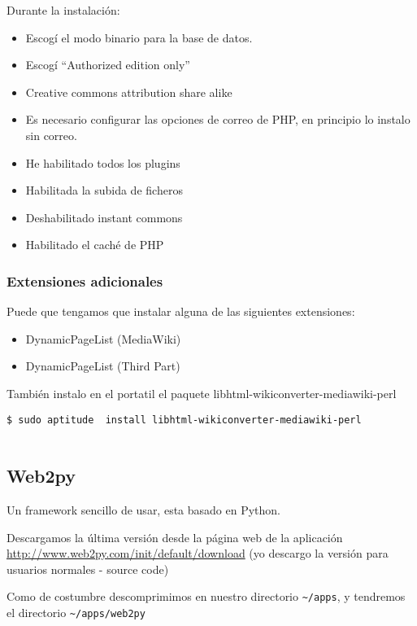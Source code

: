 Durante la instalación:

\begin{itemize}
\item
  Escogí el modo binario para la base de datos.
\item
  Escogí ``Authorized edition only''
\item
  Creative commons attribution share alike
\item
  Es necesario configurar las opciones de correo de PHP, en principio lo
  instalo sin correo.
\item
  He habilitado todos los plugins
\item
  Habilitada la subida de ficheros
\item
  Deshabilitado instant commons
\item
  Habilitado el caché de PHP
\end{itemize}

\subsubsection{Extensiones adicionales}\label{extensiones-adicionales}

Puede que tengamos que instalar alguna de las siguientes extensiones:

\begin{itemize}
\item
  DynamicPageList (MediaWiki)
\item
  DynamicPageList (Third Part)
\end{itemize}

También instalo en el portatil el paquete
libhtml-wikiconverter-mediawiki-perl

\begin{verbatim}
$ sudo aptitude  install libhtml-wikiconverter-mediawiki-perl
        
\end{verbatim}

\subsection{Web2py}\label{web2py}

Un framework sencillo de usar, esta basado en Python.

Descargamos la última versión desde la página web de la aplicación
\url{http://www.web2py.com/init/default/download} (yo descargo la
versión para usuarios normales - source code)

Como de costumbre descomprimimos en nuestro directorio
\texttt{\textasciitilde{}/apps}, y tendremos el directorio
\texttt{\textasciitilde{}/apps/web2py}

